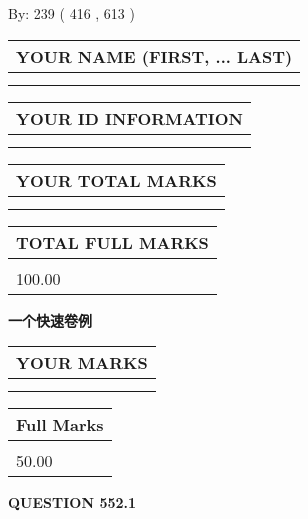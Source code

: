 \documentclass{ctexart}
\begin{document}
   
\hspace{1.0in} By: 
 239 ( 416 ,  613 )
   
   
   
   
\newpage 
\setcounter{page}{ 
   552001 } 
   
   
   
   
\noindent\begin{tabular}{|l|}
\hline
YOUR NAME (FIRST, ... LAST)  \\
\hline
 \\ 
 \\ 
\hline
\end{tabular}
\hspace{0.05in} \begin{tabular}{|l|}
\hline
 YOUR   ID   INFORMATION  \\
\hline
 \\ 
 \\ 
\hline
\end{tabular}
   
   
\vspace{0.2in}\noindent\begin{tabular}{|l|}
\hline
YOUR TOTAL MARKS  \\
\hline
 \\ 
 \\ 
\hline
\end{tabular}
\hspace{0.05in} \begin{tabular}{|l|}
\hline
TOTAL FULL MARKS  \\
\hline
 \\ 
100.00 \\
\hline
\end{tabular}
   
   
 \vspace{0.2in}
{\LARGE {\textbf{ 一个快速卷例}}}
   
   
  
\vspace{0.2in}
  
\noindent\begin{tabular}{|l|}
\hline
 YOUR MARKS  \\
\hline
 \\ 
 \\ 
\hline
\end{tabular}
\hspace{0.05in} \begin{tabular}{|l|}
\hline
 Full Marks  \\
\hline
 \\ 
50.00 \\
\hline
\end{tabular}
{\textbf{\Large{QUESTION
552.1 
}}}
  
\end{document}
